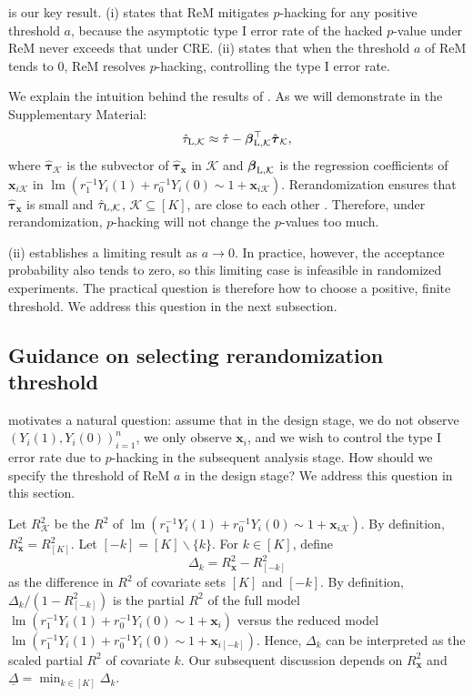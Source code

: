 \documentclass[12pt]{article}
\newcommand{\lmm}{\operatorname{lm}}
\newcommand{\Lin}{\textnormal{L}}
\newcommand{\mk}{\mathcal{K}}
\newcommand{\bs}{\boldsymbol}
\newcommand{\lx}[1]{#1}
\begin{document}
 is our key result.  (i) states that ReM mitigates $p$-hacking for any positive threshold $a$, because the asymptotic type I error rate of the hacked $p$-value under ReM never exceeds that under CRE.  (ii) states that when the threshold $a$ of ReM tends to $0$, ReM resolves $p$-hacking, controlling the type I error rate. 

We explain the intuition behind the results of . As we will demonstrate in the Supplementary Material: 
\begin{align}
\label{eq:decompose-of-hat-tau-lin}
    \hat{\tau}_{\Lin, \mk} \approx \hat{\tau} - \bs{\beta}_{\Lin,\mk}^\top \hat{\bs{\tau}}_{\mk},
\end{align}
where $\hat{\bs{\tau}}_{\mk}$ is the subvector of $\hat{\bs{\tau}}_{\bs{x}}$ in $\mk$ and $\bs{\beta}_{\Lin,\mk}$ is the regression coefficients of $\bs{x}_{i\mk}$ in $\lmm(r_1^{-1}Y_i(1)+r_0^{-1}Y_i(0)\sim 1+ \bs{x}_{i\mk})$. Rerandomization ensures that $\hat{\bs\tau}_{\bs{x}}$ is small and $\hat{\tau}_{\Lin,\mk}$, $\mk \subseteq [K]$, are close to each other \citep{zdrep}. Therefore, under rerandomization, $p$-hacking will not change the $p$-values too much.

\lx{ (ii) establishes a limiting result as
$a\to0$. In practice, however, the acceptance probability also tends to zero,
so this limiting case is infeasible in randomized experiments. The practical
question is therefore how to choose a positive, finite threshold. We address
this question in the next subsection.}

\subsection{Guidance on selecting rerandomization threshold}
 motivates a natural question: assume that in the design stage, we do not observe 
 $(Y_i(1),Y_i(0))_{i=1}^n$, we only observe $\bs{x}_i$, and we wish to control the type I error rate due to $p$-hacking in the subsequent analysis stage. How should we specify the threshold of ReM $a$ in the design stage? We address this question in this section.

  Let $R^2_{\mk}$ be the $R^2$ of $\lmm(r_1^{-1}Y_i(1)+r_0^{-1}Y_i(0)\sim 1+ \bs{x}_{i\mk})$. By definition, $R^2_{\bs{x}} = R^2_{[K]}$. Let $[-k] = [K]\backslash \{k\}$. For $k\in [K]$, define
 \[
\Delta_k = R^2_{\bs{x}}-R_{[-k]}^2
 \]
as the difference in $R^2$ of covariate sets $[K]$ and $[-k]$. By definition, $\Delta_k/(1-R_{[-k]}^2)$ is the partial $R^2$ of the full model $\lmm(r_1^{-1} Y_i(1)+r_0^{-1} Y_i(0)\sim 1 + \bs{x}_{i})$ versus the reduced model $\lmm(r_1^{-1} Y_i(1)+r_0^{-1} Y_i(0)\sim 1 + \bs{x}_{i[-k]})$. Hence, $\Delta_k$ can be interpreted as the scaled partial $R^2$ of covariate $k$.  Our subsequent discussion depends on $R^2_{\bs{x}}$ and $\underline{\Delta} = \min_{k\in [K]} \Delta_k$.
 
\end{document}
